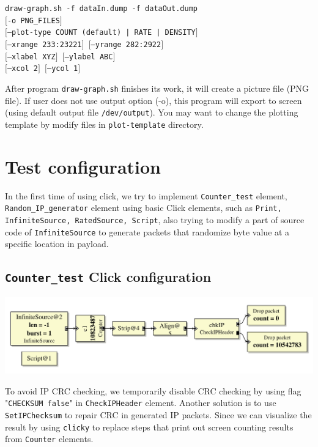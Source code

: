 \documentclass[a4paper]{article}
\begin{document}
\begin{enumerate}
\texttt{draw-graph.sh -f dataIn.dump -f dataOut.dump \\
      $[$-o PNG\_FILES$]$\\
      $[$--plot-type COUNT (default) | RATE | DENSITY$]$\\
      $[$--xrange 233:23221$]$  $[$--yrange 282:2922$]$\\
      $[$--xlabel XYZ$]$  $[$--ylabel ABC$]$\\
      $[$--xcol 2$]$  $[$--ycol 1$]$}
      
  After program \texttt{draw-graph.sh} finishes its work, it will create a picture file (PNG file). If user does not use output option (-o), this program will export to screen (using default output file \texttt{/dev/output}). You may want to change the plotting template by modify files in \texttt{plot-template} directory.
      \end{enumerate}
  \section{Test configuration}
  In the first time of using click, we try to implement \texttt{Counter\_test} element, \texttt{Random\_IP\_generator} element using basic Click elements, such as \texttt{Print, InfiniteSource, RatedSource, Script}, also trying to modify a part of source code of \texttt{InfiniteSource} to generate packets that randomize byte value at a specific location in payload.
  \subsection{\texttt{Counter\_test} Click configuration}
  \begin{center}
	  \includegraphics[scale=0.6]{counter_test.pdf}
	  \label{fig:countertest}
  \end{center}
  To avoid IP CRC checking, we temporarily disable CRC checking by using flag "\texttt{CHECKSUM false}" in \texttt{CheckIPHeader} element. Another solution is to use \texttt{SetIPChecksum} to repair CRC in generated IP packets. Since we can visualize the result by using \texttt{clicky} to replace steps that print out screen counting results from \texttt{Counter} elements. 
\end{document}
